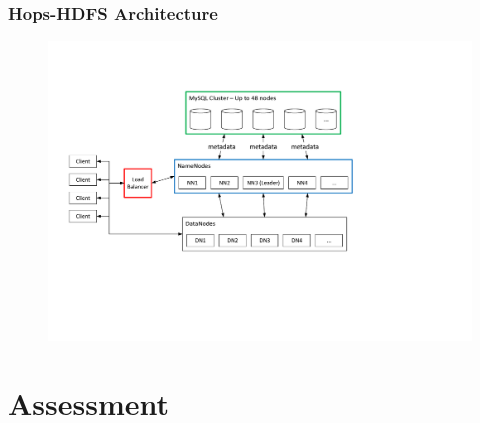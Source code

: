 \documentclass{beamer}
\begin{document}
\begin{frame}
	\frametitle{Hops-HDFS Architecture}
	\begin{figure}[h!]
		\centering
		\includegraphics[width=\linewidth]{figs/HopHDFSArchitecture2.pdf}
	\end{figure}
\end{frame}
\section{Assessment}
\end{document}
